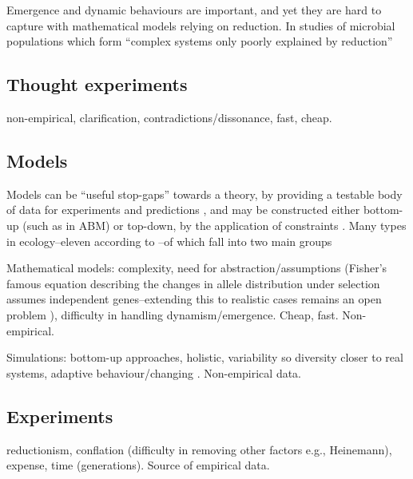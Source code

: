 Emergence and dynamic behaviours are important, and yet they are hard to capture with mathematical models relying on reduction. In studies of microbial populations which form ``complex systems only poorly explained by reduction'' \autocite{Ferrer:2008hv}

\subsection{Thought experiments}\label{thought-experiments}

non-empirical, clarification, contradictions/dissonance, fast, cheap.

\subsection{Models}\label{models}


Models can be ``useful stop-gaps'' towards a theory, by providing a testable body of data for experiments and predictions \autocite{Krakauer2011}, and may be constructed either bottom-up (such as in ABM) or top-down, by the application of constraints \autocite{Krakauer2011}. Many types in \eg ecology--eleven according to \autocite{Jorgensen2008}--of which fall into two main groups

Mathematical models: complexity, need for abstraction/assumptions
(\eg Fisher's famous equation describing the changes in allele
distribution under selection assumes independent genes--extending this
to realistic cases remains an open problem \autocite{Schuster2011}),
difficulty in handling dynamism/emergence. Cheap, fast. Non-empirical.

Simulations: bottom-up approaches, holistic, variability so diversity
closer to real systems, adaptive behaviour/changing
\autocite{Ferrer:2008hv}. Non-empirical data.

\subsection{Experiments}\label{experiments}

reductionism, conflation (difficulty in removing other factors e.g.,
Heinemann), expense, time (generations). Source of empirical data.

